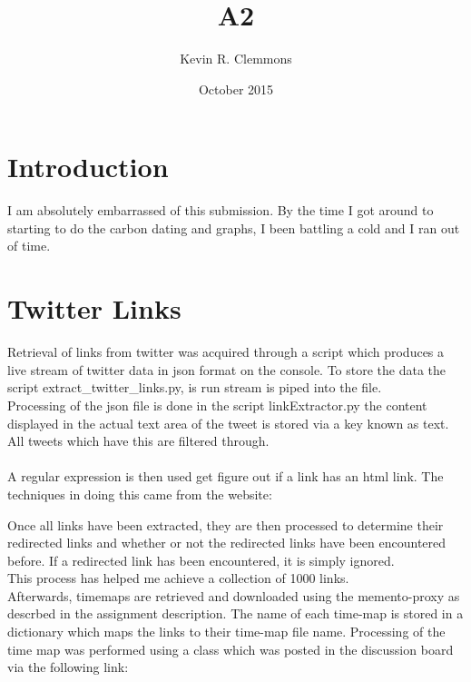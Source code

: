 \documentclass[a4paper,12pt]{article}
\title{A2}
\author{Kevin R. Clemmons}
\date{October 2015}
\begin{document}
\maketitle
\newpage 
%
\section{Introduction} 
I am absolutely embarrassed of this submission. By the time I got around to starting to do the carbon dating and graphs, I been battling a cold and I ran out of time.

\section{Twitter Links}
Retrieval of links from twitter was acquired through a script which produces a live stream of twitter data in json format on the console. To store the data the script extract_twitter_links.py, is run stream is piped into the file. \\ 
Processing of the json file is done in the script linkExtractor.py the content displayed in the actual text area of the tweet is stored via a key known as text. All tweets which have this are filtered through. \\ \\ 
A regular expression is then used get figure out if a link has an html link. The techniques in doing this came from the website:   
Once all links have been extracted, they are then processed to determine their redirected links and whether or not the redirected links have been encountered before. If a redirected link has been encountered, it is simply ignored. \\
This process has helped me achieve a collection of 1000 links. \\
Afterwards, timemaps are retrieved and downloaded using the memento-proxy as descrbed in the assignment description. The name of each time-map is stored in a dictionary which maps the links to their time-map file name. Processing of the time map was performed using a class which was posted in the discussion board via the following link: 
\end{document}
